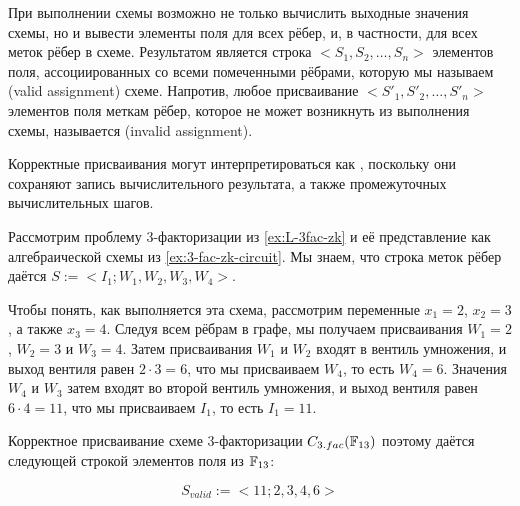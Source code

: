 При выполнении схемы возможно не только вычислить выходные значения схемы, но и вывести элементы поля для всех рёбер, и, в частности, для всех меток рёбер в схеме. Результатом является строка $<S_1,S_2,\ldots, S_n>$ элементов поля, ассоциированных со всеми помеченными рёбрами, которую мы называем  (valid assignment) схеме. Напротив, любое присваивание $<S'_1,S'_2,\ldots, S'_n>$ элементов поля меткам рёбер, которое не может возникнуть из выполнения схемы, называется  (invalid assignment).

Корректные присваивания могут интерпретироваться как , поскольку они сохраняют запись вычислительного результата, а также промежуточных вычислительных шагов.
\begin{example}[3-factorization]
\label{ex:3-fac-zk-circuit_2}
Рассмотрим проблему $3$-факторизации из \examplename{} \ref{ex:L-3fac-zk} и её представление как алгебраической схемы из \examplename{} \ref{ex:3-fac-zk-circuit}. Мы знаем, что строка меток рёбер даётся $S:=<I_{1};W_{1},W_{2},W_{3}, W_{4}>$. 

Чтобы понять, как выполняется эта схема, рассмотрим переменные $x_1=2$, $x_2=3$, а также $x_3=4$. Следуя всем рёбрам в графе, мы получаем присваивания $W_1=2$, $W_2=3$ и $W_3=4$. Затем присваивания $W_1$ и $W_2$ входят в вентиль умножения, и выход вентиля равен $2\cdot 3 = 6$, что мы присваиваем $W_4$, то есть $W_4=6$. Значения $W_4$ и $W_3$ затем входят во второй вентиль умножения, и выход вентиля равен $6\cdot 4 = 11$, что мы присваиваем $I_1$, то есть $I_1=11$. 

Корректное присваивание схеме $3$-факторизации $C_{3.fac}(\mathbb{F}_{13})$ поэтому даётся следующей строкой элементов поля из $\mathbb{F}_{13}$:

\begin{equation}\label{C3fac}
S_{valid}:=<11;2,3,4,6>
\end{equation}


\end{example}
